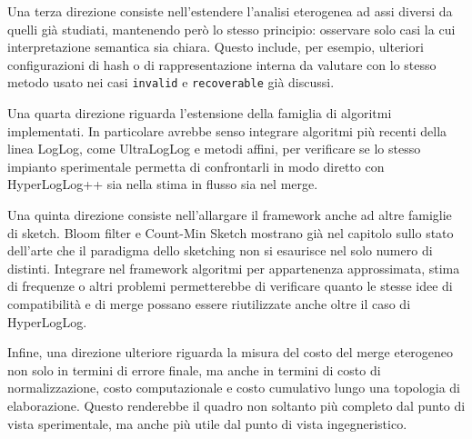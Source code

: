 Una terza direzione consiste nell'estendere l'analisi eterogenea ad assi
diversi da quelli già studiati, mantenendo però lo stesso principio: osservare
solo casi la cui interpretazione semantica sia chiara. Questo include, per
esempio, ulteriori configurazioni di hash o di rappresentazione interna da
valutare con lo stesso metodo usato nei casi \texttt{invalid} e
\texttt{recoverable} già discussi.

Una quarta direzione riguarda l'estensione della famiglia di algoritmi
implementati. In particolare avrebbe senso integrare algoritmi più recenti
della linea LogLog, come UltraLogLog e metodi affini, per verificare se lo
stesso impianto sperimentale permetta di confrontarli in modo diretto con
HyperLogLog++ sia nella stima in flusso sia nel merge.

Una quinta direzione consiste nell'allargare il framework anche ad altre
famiglie di sketch. Bloom filter e Count-Min Sketch mostrano già nel capitolo
sullo stato dell'arte che il paradigma dello sketching non si esaurisce nel
solo numero di distinti. Integrare nel framework algoritmi per appartenenza
approssimata, stima di frequenze o altri problemi permetterebbe di verificare
quanto le stesse idee di compatibilità e di merge possano essere riutilizzate
anche oltre il caso di HyperLogLog.

Infine, una direzione ulteriore riguarda la misura del costo del merge
eterogeneo non solo in termini di errore finale, ma anche in termini di costo
di normalizzazione, costo computazionale e costo cumulativo lungo una topologia
di elaborazione. Questo renderebbe il quadro non soltanto più completo dal
punto di vista sperimentale, ma anche più utile dal punto di vista
ingegneristico.
